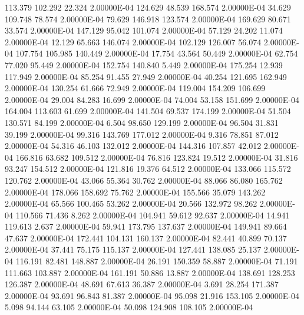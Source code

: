    113.379   102.292    22.324  2.00000E-04
   124.629    48.539   168.574  2.00000E-04
    34.629   109.748    78.574  2.00000E-04
    79.629   146.918   123.574  2.00000E-04
   169.629    80.671    33.574  2.00000E-04
   147.129    95.042   101.074  2.00000E-04
    57.129    24.202    11.074  2.00000E-04
    12.129    65.663   146.074  2.00000E-04
   102.129   126.007    56.074  2.00000E-04
   107.754   105.985   140.449  2.00000E-04
    17.754    43.564    50.449  2.00000E-04
    62.754    77.020    95.449  2.00000E-04
   152.754   140.840     5.449  2.00000E-04
   175.254    12.939   117.949  2.00000E-04
    85.254    91.455    27.949  2.00000E-04
    40.254   121.695   162.949  2.00000E-04
   130.254    61.666    72.949  2.00000E-04
   119.004   154.209   106.699  2.00000E-04
    29.004    84.283    16.699  2.00000E-04
    74.004    53.158   151.699  2.00000E-04
   164.004   113.603    61.699  2.00000E-04
   141.504    69.537   174.199  2.00000E-04
    51.504   130.571    84.199  2.00000E-04
     6.504    98.650   129.199  2.00000E-04
    96.504    31.831    39.199  2.00000E-04
    99.316   143.769   177.012  2.00000E-04
     9.316    78.851    87.012  2.00000E-04
    54.316    46.103   132.012  2.00000E-04
   144.316   107.857    42.012  2.00000E-04
   166.816    63.682   109.512  2.00000E-04
    76.816   123.824    19.512  2.00000E-04
    31.816    93.247   154.512  2.00000E-04
   121.816    19.376    64.512  2.00000E-04
   133.066   115.572   120.762  2.00000E-04
    43.066    55.364    30.762  2.00000E-04
    88.066    86.080   165.762  2.00000E-04
   178.066   158.692    75.762  2.00000E-04
   155.566    35.079   143.262  2.00000E-04
    65.566   100.465    53.262  2.00000E-04
    20.566   132.972    98.262  2.00000E-04
   110.566    71.436     8.262  2.00000E-04
   104.941    59.612    92.637  2.00000E-04
    14.941   119.613     2.637  2.00000E-04
    59.941   173.795   137.637  2.00000E-04
   149.941    89.664    47.637  2.00000E-04
   172.441   104.131   160.137  2.00000E-04
    82.441    40.899    70.137  2.00000E-04
    37.441    75.175   115.137  2.00000E-04
   127.441   138.085    25.137  2.00000E-04
   116.191    82.481   148.887  2.00000E-04
    26.191   150.359    58.887  2.00000E-04
    71.191   111.663   103.887  2.00000E-04
   161.191    50.886    13.887  2.00000E-04
   138.691   128.253   126.387  2.00000E-04
    48.691    67.613    36.387  2.00000E-04
     3.691    28.254   171.387  2.00000E-04
    93.691    96.843    81.387  2.00000E-04
    95.098    21.916   153.105  2.00000E-04
     5.098    94.144    63.105  2.00000E-04
    50.098   124.908   108.105  2.00000E-04
